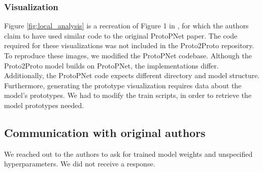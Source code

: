 \subsubsection{Visualization}
Figure \ref{fig:local_analysis} is a recreation of Figure 1 in \citet{keswani2022proto2proto}, for which the authors claim to have used similar code to the original ProtoPNet paper. The code required for these visualizations was not included in the Proto2Proto repository. To reproduce these images, we modified the ProtoPNet codebase. 
Although the Proto2Proto model builds on ProtoPNet, the implementations differ. 
Additionally, the ProtoPNet code expects different directory and model structure. Furthermore, generating the prototype visualization requires data about the model's prototypes. We had to modify the train scripts, in order to retrieve the model prototypes needed.




\subsection{Communication with original authors}

We reached out to the authors to ask for trained model weights and unspecified hyperparameters. We did not receive a response.
